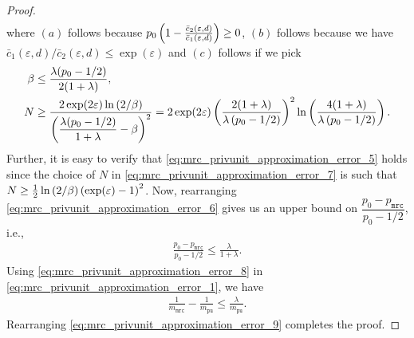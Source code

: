 \begin{proof}
\begin{align}
\end{align}
where $(a)$ follows because $p_0 \left(1-\frac{ \bar{c}_2(\varepsilon, d)}{ \bar{c}_1(\varepsilon, d)}\right) \geq 0$, $(b)$ follows because we have $ \bar{c}_1(\varepsilon,d)/  \bar{c}_2(\varepsilon,d) \leq \exp(\varepsilon)$ and $(c)$ follows if we pick 
\begin{align}
    \beta & \leq \frac{\lambda(p_0 - 1/2)}{2(1+\lambda)}, \\
    N & \geq\frac{2\exp(2\varepsilon)\ln \left( 2/\beta \right)}{\left( \dfrac{\lambda(p_0 - 1/2)}{1+\lambda} - \beta \right)^2}
    = 2\exp(2\varepsilon)\left(\frac{2 (1+\lambda)}{\lambda \left( p_0 -1/2 \right)}\right)^2 \ln\left( \frac{4(1+\lambda)}{\lambda \left( p_0 -1/2 \right)} \right). \label{eq:mrc_privunit_approximation_error_7}
\end{align}
Further, it is easy to verify that \eqref{eq:mrc_privunit_approximation_error_5} holds since the choice of $N$ in \eqref{eq:mrc_privunit_approximation_error_7} is such that $N \geq \frac{1}{2} \ln \left( 2/\beta \right) \left(\exp(\varepsilon)-1\right)^2$. Now, rearranging \eqref{eq:mrc_privunit_approximation_error_6} gives us an upper bound on $\dfrac{p_0 - p_{\texttt{mrc}}}{p_0 -1/2}$, i.e.,
\begin{align}
    \frac{p_0 - p_{\texttt{mrc}}}{p_0 -1/2} \leq \frac{\lambda}{1+\lambda}. \label{eq:mrc_privunit_approximation_error_8}
\end{align}
Using \eqref{eq:mrc_privunit_approximation_error_8} in \eqref{eq:mrc_privunit_approximation_error_1}, we have
\begin{align}
    \frac{1}{m_\texttt{mrc}} - \frac{1}{m_{\texttt{pu}}} \leq \frac{\lambda}{m_{\texttt{pu}}}. \label{eq:mrc_privunit_approximation_error_9}
\end{align}
Rearranging \eqref{eq:mrc_privunit_approximation_error_9} completes the proof.
\end{proof}

